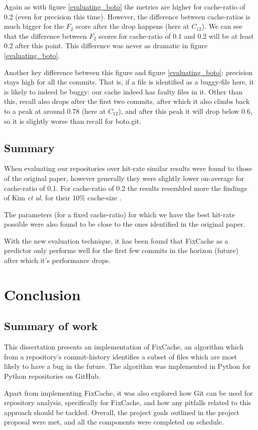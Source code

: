 \documentclass[12pt,twoside,notitlepage]{report}
\newcommand{\fxch}{FixCache}
\newcommand{\etal}{\textit{et al.}}
\begin{document}
Again as with figure \ref{evaluating_boto} the metrics are higher for cache-ratio of 0.2 (even for precision this time). However, the difference between cache-ratios is much bigger for the $F_2$ score after the drop happens (here at $C_{12}$). We can see that the difference between $F_2$ scores for cache-ratio of 0.1 and 0.2 will be at least 0.2 after this point. This difference was never as dramatic in figure \ref{evaluating_boto}.

Another key difference between this figure and figure \ref{evaluating_boto}: precision stays high for all the commits. That is, if a file is identified as a buggy-file here, it is likely to indeed be buggy: our cache indeed has faulty files in it. Other than this, recall also drops after the first two commits, after which it also climbs back to a peak at around 0.78 (here at $C_{12}$), and after this peak it will drop below 0.6, so it is slightly worse than recall for boto.git.
\section{Summary}
When evaluating our repositories over hit-rate similar results were found to those of the original paper, however generally they were slightly lower on-average for cache-ratio of 0.1. For cache-ratio of 0.2 the results resembled more the findings of Kim \etal{} for their 10\% cache-size \cite{FixCache}.

The parameters (for a fixed cache-ratio) for which we have the best hit-rate possible were also found to be close to the ones identified in the original paper.

With the new evaluation technique, it has been found that \fxch{} as a predictor only performs well for the first few commits in the horizon (future) after which it's performance drops.
\cleardoublepage
\chapter{Conclusion}
\section{Summary of work}
This dissertation presents an implementation of \fxch{}, an algorithm which from a repository's commit-history identifies a subset of files which are most likely to have a bug in the future. The algorithm was implemented in Python for Python repositories on GitHub. 

Apart from implementing \fxch{}, it was also explored how Git can be used for repository analysis, specifically for \fxch{}, and how any pitfalls related to this approach should be tackled. Overall, the project goals outlined in the project proposal were met, and all the components were completed on schedule. 
\end{document}

